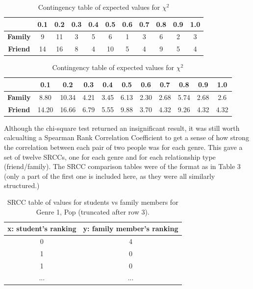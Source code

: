 \documentclass[12pt]{report}
\begin{document}
\begin{table}[h!]
\begin{center}

\begin{tabular}{ c|c|c|c|c|c|c|c|c|c|c }
  & \textbf{0.1} & \textbf{0.2} & \textbf{0.3} & \textbf{0.4} & \textbf{0.5} & \textbf{0.6} & \textbf{0.7} & \textbf{0.8} & \textbf{0.9} & \textbf{1.0} \\ 
  \hline \hline
  \textbf{Family} & 9 & 11 & 3 & 5 & 6 & 1 & 3 & 6 & 2 & 3\\
  \hline
  \textbf{Friend} & 14 & 16 & 8 & 4 & 10 & 5 & 4 & 9 & 5 & 4 \\
\end{tabular}

\caption{Contingency table of observed values for $\chi^2$}

\vspace{20pt}

\begin{tabular}{ c|c|c|c|c|c|c|c|c|c|c }
  & \textbf{0.1} & \textbf{0.2} & \textbf{0.3} & \textbf{0.4} & \textbf{0.5} & \textbf{0.6} & \textbf{0.7} & \textbf{0.8} & \textbf{0.9} & \textbf{1.0} \\
  \hline \hline
  \textbf{Family} & 8.80 & 10.34 & 4.21 & 3.45 & 6.13 & 2.30 & 2.68 & 5.74 & 2.68 & 2.6 \\
  \hline
  \textbf{Friend} & 14.20 & 16.66 & 6.79 & 5.55 & 9.88 & 3.70 & 4.32 & 9.26 & 4.32 & 4.32 \\
\end{tabular}

\caption{Contingency table of expected values for $\chi^2$}

\end{center}
\end{table}

Although the chi-square test returned an insignificant result, it was still worth calcualting a Spearman Rank Correlation Coefficient to get a sense of how strong the correlation between each pair of two people was for each genre. This gave a set of twelve SRCCs, one for each genre and for each relationship type (friend/family). The SRCC comparison tables were of the format as in Table 3 (only a part of the first one is included here, as they were all similarly structured.)

\begin{table}[h!]
\begin{center}
\begin{tabular}{ c|c }
 x: student's ranking & y: family member's ranking \\
 \hline
 0 & 4 \\
 \hline
 1 & 0 \\
 \hline
 1 & 0 \\
 \hline
 ... & ... \\
 \hline
\end{tabular}
\caption{SRCC table of values for students vs family members for Genre 1, Pop (truncated after row 3).}
\end{center}
\end{table}
\end{document}
